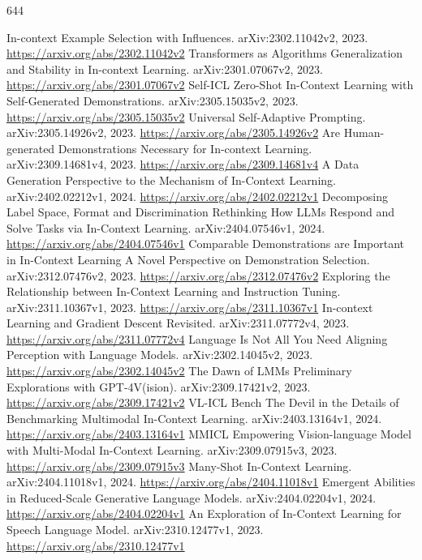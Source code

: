 \documentclass[11pt]{article}
\begin{document}
\begin{thebibliography}{644}
 In-context Example Selection with Influences. arXiv:2302.11042v2, 2023. \url{https://arxiv.org/abs/2302.11042v2}
 Transformers as Algorithms Generalization and Stability in In-context Learning. arXiv:2301.07067v2, 2023. \url{https://arxiv.org/abs/2301.07067v2}
 Self-ICL Zero-Shot In-Context Learning with Self-Generated Demonstrations. arXiv:2305.15035v2, 2023. \url{https://arxiv.org/abs/2305.15035v2}
 Universal Self-Adaptive Prompting. arXiv:2305.14926v2, 2023. \url{https://arxiv.org/abs/2305.14926v2}
 Are Human-generated Demonstrations Necessary for In-context Learning. arXiv:2309.14681v4, 2023. \url{https://arxiv.org/abs/2309.14681v4}
 A Data Generation Perspective to the Mechanism of In-Context Learning. arXiv:2402.02212v1, 2024. \url{https://arxiv.org/abs/2402.02212v1}
 Decomposing Label Space, Format and Discrimination Rethinking How LLMs Respond and Solve Tasks via In-Context Learning. arXiv:2404.07546v1, 2024. \url{https://arxiv.org/abs/2404.07546v1}
 Comparable Demonstrations are Important in In-Context Learning A Novel Perspective on Demonstration Selection. arXiv:2312.07476v2, 2023. \url{https://arxiv.org/abs/2312.07476v2}
 Exploring the Relationship between In-Context Learning and Instruction Tuning. arXiv:2311.10367v1, 2023. \url{https://arxiv.org/abs/2311.10367v1}
 In-context Learning and Gradient Descent Revisited. arXiv:2311.07772v4, 2023. \url{https://arxiv.org/abs/2311.07772v4}
 Language Is Not All You Need Aligning Perception with Language Models. arXiv:2302.14045v2, 2023. \url{https://arxiv.org/abs/2302.14045v2}
 The Dawn of LMMs Preliminary Explorations with GPT-4V(ision). arXiv:2309.17421v2, 2023. \url{https://arxiv.org/abs/2309.17421v2}
 VL-ICL Bench The Devil in the Details of Benchmarking Multimodal In-Context Learning. arXiv:2403.13164v1, 2024. \url{https://arxiv.org/abs/2403.13164v1}
 MMICL Empowering Vision-language Model with Multi-Modal In-Context Learning. arXiv:2309.07915v3, 2023. \url{https://arxiv.org/abs/2309.07915v3}
 Many-Shot In-Context Learning. arXiv:2404.11018v1, 2024. \url{https://arxiv.org/abs/2404.11018v1}
 Emergent Abilities in Reduced-Scale Generative Language Models. arXiv:2404.02204v1, 2024. \url{https://arxiv.org/abs/2404.02204v1}
 An Exploration of In-Context Learning for Speech Language Model. arXiv:2310.12477v1, 2023. \url{https://arxiv.org/abs/2310.12477v1}

\end{thebibliography}
\end{document}
